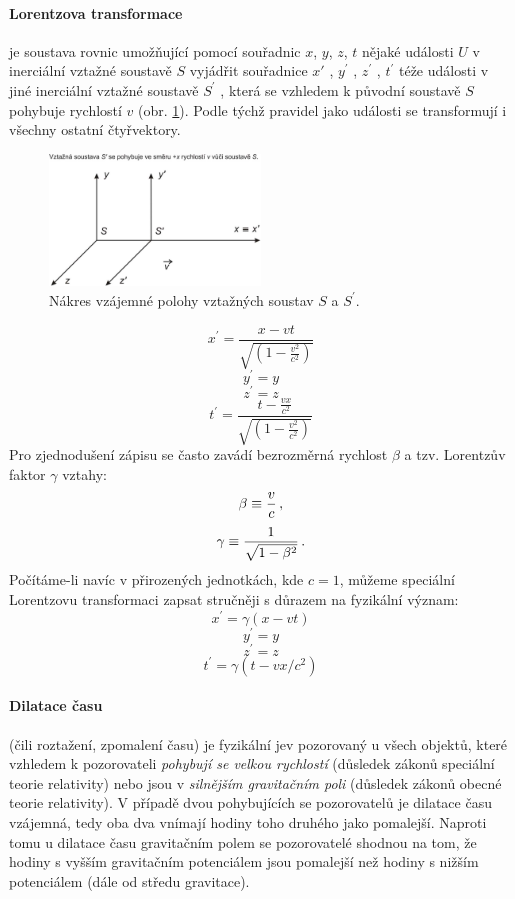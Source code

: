 \documentclass[11pt,a4paper,notitlepage,twocolumn]{article}
\begin{document}
\paragraph{Lorentzova transformace}
je soustava rovnic umožňující pomocí souřadnic $ x $, $ y $, $ z $, $ t $
nějaké události $ U $ v inerciální vztažné soustavě $ S $ vyjádřit souřadnice $ x' $ ,
 $ y^\prime $ , $ z^\prime $ , $ t^\prime $ 
téže události v jiné inerciální vztažné soustavě $ S^\prime $ , která se vzhledem k původní 
soustavě $ S $ pohybuje rychlostí $ v  $ (obr. \ref{fig:vztazna_soustava}). 
Podle týchž pravidel jako události se transformují i všechny ostatní čtyřvektory.
\begin{figure}[H]
\includegraphics[width=0.5\textwidth]{vztazna_soustava}
\caption{Nákres vzájemné polohy vztažných soustav $ S $ a $ S^\prime $.}
\label{fig:vztazna_soustava}
\end{figure}
\[ x^\prime = \frac{x - vt}{\sqrt{(1 - \frac{v^2}{c^2})}} \]
\[ y^\prime = y \]
\[ z^\prime = z \]
\[ t^\prime = \frac{t - \frac{vx}{c^2}}{\sqrt{(1 - \frac{v^2}{c^2})}} \]
Pro zjednodušení zápisu se často zavádí bezrozměrná rychlost $ \beta $ a tzv. 
Lorentzův faktor $ \gamma $ vztahy:
\[ \beta \equiv {v\over c} \,, \]
\[ \gamma \equiv {1 \over \sqrt{1-\beta^2}} \,. \]
Počítáme-li navíc v přirozených jednotkách, kde $ c = 1 $, můžeme speciální 
Lorentzovu transformaci zapsat stručněji s důrazem na fyzikální význam:
\[x^\prime = \gamma\left(x - vt\right)\]
\[y^\prime = y\]
\[z^\prime = z\]
\[t^\prime = \gamma\left(t - {vx/{c^2}}\right)\]



\paragraph{Dilatace času} (čili roztažení, zpomalení času) je fyzikální jev pozorovaný u všech objektů, které vzhledem k pozorovateli
\textit{pohybují se velkou rychlostí} (důsledek zákonů speciální teorie relativity) nebo
jsou v \textit{silnějším gravitačním poli} (důsledek zákonů obecné teorie relativity).
V případě dvou pohybujících se pozorovatelů je dilatace času vzájemná, tedy oba dva vnímají hodiny toho druhého jako pomalejší. Naproti tomu u dilatace času gravitačním polem se pozorovatelé shodnou na tom, že hodiny s vyšším gravitačním potenciálem jsou pomalejší než hodiny s nižším potenciálem (dále od středu gravitace).
\end{document}
